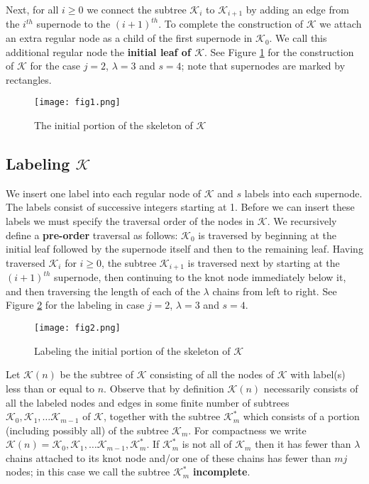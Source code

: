 \documentclass[12pt]{amsart}
\numberwithin{equation}{section}
\numberwithin{theorem}{section}
\numberwithin{table}{section}
\numberwithin{figure}{section}
\begin{document}
Next, for all $i \geq 0$ we connect the subtree ${\mathcal K}_i$ to ${\mathcal K}_{i+1}$ by adding an edge from the $i^{th}$ supernode to the $(i+1)^{th}$. To complete the construction of ${\mathcal K}$ we attach an extra regular node as a child of the first supernode in ${\mathcal K}_0$. We call this additional regular node the \textbf{initial leaf of ${\mathcal K}$}. See Figure \ref{fig1} for the construction of ${\mathcal K}$ for the case $j=2$, $\lambda=3$ and $s=4$; note that supernodes are marked by rectangles.

\begin{figure}[htpb]
\begin{center}
\texttt{[image: fig1.png]}
\caption{The initial portion of the skeleton of ${\mathcal K}$} \label{fig1}
\end{center}
\end{figure}

\subsection*{Labeling ${\mathcal K}$}
We insert one label into each regular node of ${\mathcal K}$ and $s$ labels into each supernode. The labels consist of successive integers starting at 1. Before we can insert these labels we must specify the traversal order of the nodes in ${\mathcal K}$. We recursively define a \textbf{pre-order} traversal as follows: ${\mathcal K}_0$ is traversed by beginning at the initial leaf followed by the supernode itself and then to the remaining leaf. Having traversed ${\mathcal K}_i$ for $i \geq 0$, the subtree ${\mathcal K}_{i+1}$ is traversed next by starting at the $(i+1)^{th}$ supernode, then continuing to the knot node immediately below it, and then traversing the length of each of the $\lambda$ chains from left to right. See Figure \ref{fig2} for the labeling in case $j=2$, $\lambda=3$ and $s=4$.

\begin{figure}[htpb]
\begin{center}
\texttt{[image: fig2.png]}
\caption{Labeling the initial portion of the skeleton of ${\mathcal K}$} \label{fig2}
\end{center}
\end{figure}

Let ${\mathcal K}(n)$ be the subtree of ${\mathcal K}$ consisting of all the nodes of ${\mathcal K}$ with label(s) less than or equal to $n$. Observe that by definition ${\mathcal K}(n)$ necessarily consists of all the labeled nodes and edges in some finite number of subtrees ${\mathcal K}_0, {\mathcal K}_1, \ldots {\mathcal K}_{m-1}$ of ${\mathcal K}$, together with the subtree ${\mathcal K}^*_m$ which consists of a portion (including possibly all) of the subtree ${\mathcal K}_m$. For compactness we write ${\mathcal K}(n) = {\mathcal K}_0, {\mathcal K}_1, \ldots {\mathcal K}_{m-1}, {\mathcal K}^*_m$. If ${\mathcal K}^*_m$ is not all of ${\mathcal K}_m$ then it has fewer than $\lambda$ chains attached to its knot node and/or one of these chains has fewer than $mj$ nodes; in this case we call the subtree ${\mathcal K}^*_m$ \textbf{incomplete}.
\end{document}
